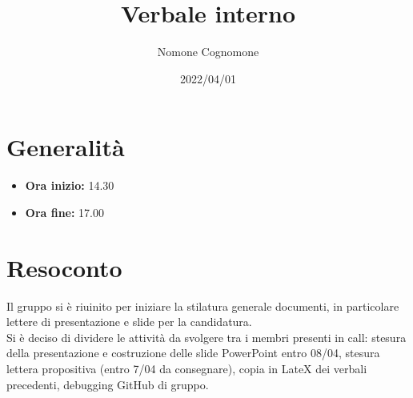 \documentclass{classes/base}
\title{Verbale interno}
\date{2022/04/01}
\author{Nomone Cognomone}
\renewcommand{\maketitle}{
    
}
\begin{document}
    \maketitle

    \section{Generalità}
    \begin{itemize}
        \item \textbf{Ora inizio:} 14.30
        \item \textbf{Ora fine:} 17.00
    \end{itemize}
    
    \section{Resoconto}
    Il gruppo si è riuinito per iniziare la stilatura generale documenti, in particolare lettere di presentazione e slide per la candidatura.\\
    Si è deciso di dividere le attività da svolgere tra i membri presenti in call: stesura della presentazione e costruzione delle slide PowerPoint entro 08/04, stesura lettera propositiva (entro 7/04 da consegnare), copia in LateX dei verbali precedenti, debugging GitHub di gruppo.
\end{document}
